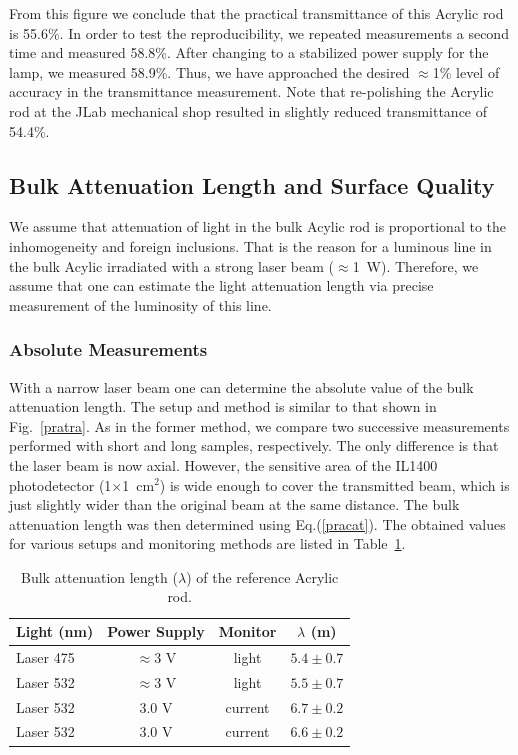 From this figure we conclude that the practical transmittance of this Acrylic 
rod is 55.6\%.  In order to test the reproducibility, we repeated measurements 
a second time and measured 58.8\%.   After changing to a stabilized power
supply for the lamp, we measured 58.9\%.  Thus, we have approached the desired 
$\approx$1\% level of accuracy in the transmittance measurement.  Note that
re-polishing the Acrylic rod at the JLab mechanical shop resulted in slightly 
reduced transmittance of 54.4\%.
  
\subsection{Bulk Attenuation Length and Surface Quality}
\label{BAL}

We assume that attenuation of light in the bulk Acylic rod is proportional to 
the inhomogeneity and foreign inclusions.  That is the reason for a luminous line 
in the bulk Acylic irradiated with a strong laser beam ($\approx$1~W).  Therefore, 
we assume that one can estimate the light attenuation length via precise measurement 
of the luminosity of this line.  

\subsubsection{Absolute Measurements}
\label{absmea}

With a narrow laser beam one can determine the absolute value of the bulk 
attenuation length.  The setup and method is similar to that shown in 
Fig.~\ref{pratra}.  As in the former method, we compare two successive 
measurements performed with short and long samples, respectively. The only 
difference is that the laser beam is now axial.  However, the sensitive area 
of the IL1400 photodetector (1$\times$1~cm$^2$) is wide enough to cover the 
transmitted beam, which is just slightly wider than the original beam at the 
same distance.  The bulk attenuation length was then determined using  
Eq.(\ref{pracat}).  The obtained values for various setups and monitoring 
methods are listed in Table~\ref{attlen}.

\begin{table}[htbp]
\begin{center}
\begin{tabular}{|l|c|c|c|} \hline
Light (nm) & Power Supply & Monitor & $\lambda$ (m) \\ \hline
Laser 475  & $\approx$3 V & light   & $5.4\pm0.7$ \\ \hline
Laser 532  & $\approx$3 V & light   & $5.5\pm0.7$ \\ \hline
Laser 532  & 3.0 V        & current & $6.7\pm0.2$ \\ \hline
Laser 532  & 3.0 V        & current & $6.6\pm0.2$ \\ \hline
\end{tabular}
\end{center}
\caption{\small{Bulk attenuation length ($\lambda$) of the reference 
Acrylic rod.}}
\label{attlen}
\end{table}

